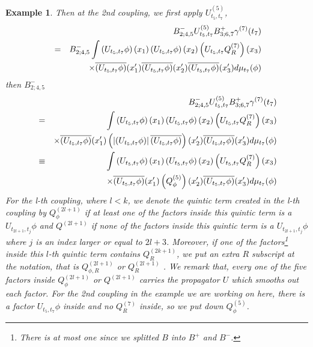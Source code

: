 \documentclass[12pt,letterpaper,leqno]{amsart}
\theoremstyle{plain}
\newtheorem{example}{Example}
\numberwithin{equation}{section}
\numberwithin{theorem}{section}
\numberwithin{proposition}{section}
\numberwithin{lemma}{section}
\numberwithin{corollary}{section}
\begin{document}
\begin{example}
Then at the 2nd coupling, we first apply $U_{t_{5},t_{7}}^{(5)}$, 
\begin{eqnarray*}
&&B_{2;4,5}^{-}U_{t_{5},t_{7}}^{(5)}B_{3;6,7}^{+}\gamma ^{(7)}(t_{7}) \\
&=&B_{2;4,5}^{-}\int \left( U_{t_{5},t_{7}}\phi \right) (x_{1})\left(
U_{t_{5},t_{7}}\phi \right) (x_{2})\left( U_{t_{5},t_{7}}Q_{R}^{(7)}\right)
(x_{3}) \\
&&\times \overline{\left( U_{t_{5},t_{7}}\phi \right) }(x_{1}^{\prime })%
\overline{\left( U_{t_{5},t_{7}}\phi \right) }(x_{2}^{\prime })\overline{%
\left( U_{t_{5},t_{7}}\phi \right) }(x_{3}^{\prime })d\mu _{t_{7}}(\phi )
\end{eqnarray*}%
then $B_{2;4,5}^{-}$ 
\begin{eqnarray*}
&&B_{2;4,5}^{-}U_{t_{5},t_{7}}^{(5)}B_{3;6,7}^{+}\gamma ^{(7)}(t_{7}) \\
&=&\int \left( U_{t_{5},t_{7}}\phi \right) (x_{1})\left( U_{t_{5},t_{7}}\phi
\right) (x_{2})\left( U_{t_{5},t_{7}}Q_{R}^{(7)}\right) (x_{3}) \\
&&\times \overline{\left( U_{t_{5},t_{7}}\phi \right) }(x_{1}^{\prime
})\left( \left\vert \left( U_{t_{5},t_{7}}\phi \right) \right\vert \overline{%
\left( U_{t_{5},t_{7}}\phi \right) }\right) (x_{2}^{\prime })\overline{%
\left( U_{t_{5},t_{7}}\phi \right) }(x_{3}^{\prime })d\mu _{t_{7}}(\phi ) \\
&\equiv &\int \left( U_{t_{5},t_{7}}\phi \right) (x_{1})\left(
U_{t_{5},t_{7}}\phi \right) (x_{2})\left( U_{t_{5},t_{7}}Q_{R}^{(7)}\right)
(x_{3}) \\
&&\times \overline{\left( U_{t_{5},t_{7}}\phi \right) }(x_{1}^{\prime
})\left( Q_{\phi }^{(5)}\right) (x_{2}^{\prime })\overline{\left(
U_{t_{5},t_{7}}\phi \right) }(x_{3}^{\prime })d\mu _{t_{7}}(\phi )
\end{eqnarray*}%
For the l-th coupling, where $l<k$, we denote the quintic term created in
the l-th coupling by $Q_{\phi }^{(2l+1)}$ if at least one of the factors
inside this quintic term is a $U_{t_{2l+1},t_{j}}\phi $ and $Q^{(2l+1)}$ if
none of the factors inside this quintic term is a $U_{t_{2l+1},t_{j}}\phi $
where $j$ is an index larger or equal to $2l+3$. Moreover, if one of the
factors\footnote{%
There is at most one since we splitted $B$ into $B^{+}$ and $B^{-}$.} inside
this $l$-th quintic term contains $Q_{R}^{(2k+1)}$, we put an extra $R$
subscript at the notation, that is $Q_{\phi ,R}^{(2l+1)}$ or $Q_{R}^{(2l+1)}$%
. We remark that, every one of the five factors inside $Q_{\phi }^{(2l+1)}$
or $Q^{(2l+1)}$ carries the propagator $U$ which smooths out each factor.
For the 2nd coupling in the example we are working on here, there is a
factor $U_{t_{5},t_{7}}\phi $ inside and no $Q_{R}^{(7)}$ inside, so we put
down $Q_{\phi }^{(5)}$.


\end{example}
\end{document}
